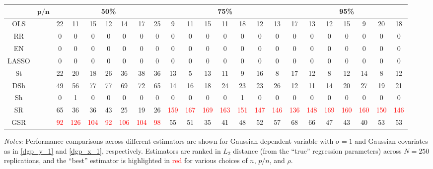\begin{table}
{\begin{tabular*}{\textwidth}{@{\extracolsep{\fill}}cc|ccccccc|ccccccc|ccccccc@{}}
\hline
\multirow{2}{*}{} & $\bm{p/n}$ & \multicolumn{7}{c|}{\textbf{50\%}} & \multicolumn{7}{c|}{\textbf{75\%}} & \multicolumn{7}{c}{\textbf{95\%}} \\
\hline
OLS &  & 22 & 11 & 15 & 12 & 14 & 17 & 25 & 9 & 11 & 15 & 11 & 18 & 12 & 13 & 17 & 13 & 12 & 15 & 9 & 20 & 18 \\
RR &  & 0 & 0 & 0 & 0 & 0 & 0 & 0 & 0 & 0 & 0 & 0 & 0 & 0 & 0 & 0 & 0 & 0 & 0 & 0 & 0 & 0 \\
EN &  & 0 & 0 & 0 & 0 & 0 & 0 & 0 & 0 & 0 & 0 & 0 & 0 & 0 & 0 & 0 & 0 & 0 & 0 & 0 & 0 & 0 \\
LASSO &  & 0 & 0 & 0 & 0 & 0 & 0 & 0 & 0 & 0 & 0 & 0 & 0 & 0 & 0 & 0 & 0 & 0 & 0 & 0 & 0 & 0 \\
St &  & 22 & 20 & 18 & 26 & 36 & 38 & 36 & 13 & 5 & 13 & 11 & 9 & 16 & 8 & 17 & 12 & 8 & 12 & 14 & 8 & 12 \\
DSh &  & 49 & 56 & 77 & 77 & 69 & 72 & 65 & 14 & 16 & 18 & 24 & 23 & 23 & 26 & 12 & 11 & 14 & 20 & 27 & 19 & 21 \\
Sh &  & 0 & 1 & 0 & 0 & 0 & 0 & 0 & 0 & 0 & 0 & 0 & 1 & 0 & 0 & 0 & 0 & 0 & 0 & 0 & 0 & 0 \\
SR &  & 65 & 36 & 36 & 43 & 25 & 19 & 26 & \textcolor{red}{159} & \textcolor{red}{167} & \textcolor{red}{169} & \textcolor{red}{163} & \textcolor{red}{151} & \textcolor{red}{147} & \textcolor{red}{146} & \textcolor{red}{136} & \textcolor{red}{148} & \textcolor{red}{169} & \textcolor{red}{160} & \textcolor{red}{160} & \textcolor{red}{150} & \textcolor{red}{146} \\
GSR &  & \textcolor{red}{92} & \textcolor{red}{126} & \textcolor{red}{104} & \textcolor{red}{92} & \textcolor{red}{106} & \textcolor{red}{104} & \textcolor{red}{98} & 55 & 51 & 35 & 41 & 48 & 52 & 57 & 68 & 66 & 47 & 43 & 40 & 53 & 53 \\
\hline
\end{tabular*}%
}
\begin{tablenotes}[flushleft]
\footnotesize
\item \emph{Notes:} Performance comparisons across different estimators are shown for Gaussian dependent variable with $\sigma=1$ and Gaussian covariates as in \eqref{dgp_y_1} and \eqref{dgp_x_1}, respectively. Estimators are ranked in $L_2$ distance (from the ``true'' regression parameters) across $N = 250$ replications, and the ``best'' estimator is highlighted in \textcolor{red}{red} for various choices of $n$, $p/n$, and $\rho$.
\end{tablenotes}
\end{table}
